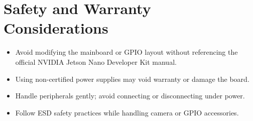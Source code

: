 \section{Safety and Warranty Considerations}

\begin{itemize}
	\item Avoid modifying the mainboard or GPIO layout without referencing the official NVIDIA Jetson Nano Developer Kit manual.
	\item Using non-certified power supplies may void warranty or damage the board.
	\item Handle peripherals gently; avoid connecting or disconnecting under power.
	\item Follow ESD safety practices while handling camera or GPIO accessories.
\end{itemize}

\vspace{0.6cm}
\noindent
